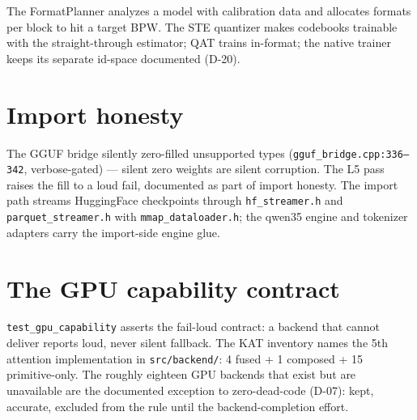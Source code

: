 \medskip
The FormatPlanner analyzes a model with calibration data and allocates formats per block to
hit a target BPW. The STE quantizer makes codebooks trainable with the straight-through
estimator; QAT trains in-format; the native trainer keeps its separate id-space documented
(D-20).

\section{Import honesty}

The GGUF bridge silently zero-filled unsupported types (\texttt{gguf\_bridge.cpp:336--342},
verbose-gated) --- silent zero weights are silent corruption. The L5 pass raises the fill to a
loud fail, documented as part of import honesty. The import path streams HuggingFace
checkpoints through \texttt{hf\_streamer.h} and \texttt{parquet\_streamer.h} with
\texttt{mmap\_dataloader.h}; the qwen35 engine and tokenizer adapters carry the import-side
engine glue.

\section{The GPU capability contract}

\texttt{test\_gpu\_capability} asserts the fail-loud contract: a backend that cannot deliver
reports loud, never silent fallback. The KAT inventory names the 5th attention implementation
in \texttt{src/backend/}: 4 fused + 1 composed + 15 primitive-only. The roughly eighteen GPU
backends that exist but are unavailable are the documented exception to zero-dead-code (D-07):
kept, accurate, excluded from the rule until the backend-completion effort.

